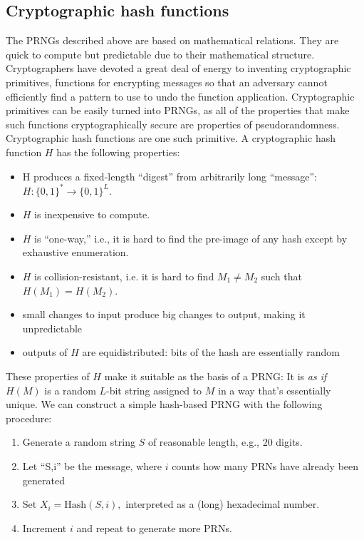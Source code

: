 \documentclass[graybox]{svmult}
\begin{document}
\subsection{Cryptographic hash functions}
The PRNGs described above are based on mathematical relations.
They are quick to compute but predictable due to their mathematical structure.
Cryptographers have devoted a great deal of energy to inventing cryptographic primitives,
functions for encrypting messages so that an adversary cannot efficiently find a pattern to use to undo the function application.
Cryptographic primitives can be easily turned into PRNGs, as all of the properties that make such functions cryptographically secure
are properties of pseudorandomness.
Cryptographic hash functions are one such primitive.
A cryptographic hash function $H$ has the following properties:

\begin{itemize}
\item H produces a fixed-length ``digest'' from arbitrarily long ``message'': $H:\{0, 1\}^* \rightarrow \{0, 1\}^L$.
\item $H$ is inexpensive to compute.
\item $H$ is ``one-way,'' i.e., it is hard to find the pre-image of any hash except by exhaustive enumeration.
\item $H$ is collision-resistant, i.e. it is hard to find $M_1 \ne M_2$ such that $H(M_1) = H(M_2)$.
\item small changes to input produce big changes to output, making it unpredictable
\item outputs of $H$ are equidistributed: bits of the hash are essentially random 
\end{itemize}

These properties of $H$ make it suitable as the basis of a PRNG:
It is \emph{as if} $H(M)$ is a random $L$-bit string assigned to $M$ in a way that's essentially unique.
We can construct a simple hash-based PRNG with the following procedure:

\begin{enumerate}
\item Generate a random string $S$ of reasonable length, e.g., 20 digits.
\item Let ``S,i'' be the message, where $i$ counts how many PRNs have already been generated
\item Set $ X_i = {\mbox{Hash}}(S,i),$ interpreted as a (long) hexadecimal number.
\item Increment $i$ and repeat to generate more PRNs.
\end{enumerate}
\end{document}
